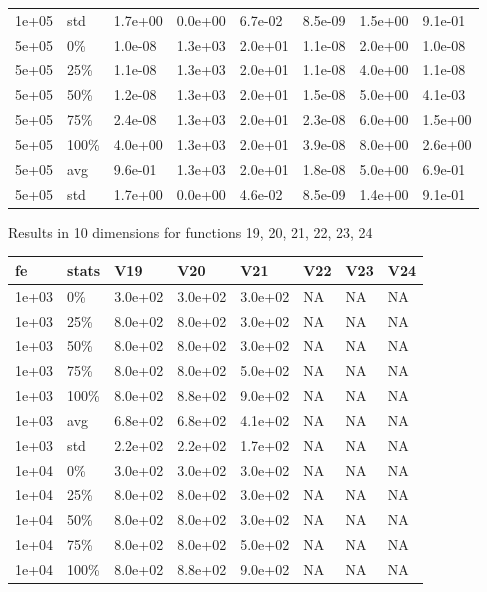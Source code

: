 \documentclass[11pt]{article}
\begin{document}
{\begin{longtable}{llllllll}
  1e+05 & std & 1.7e+00 & 0.0e+00 & 6.7e-02 & 8.5e-09 & 1.5e+00 & 9.1e-01 \\ 
  5e+05 & 0\% & 1.0e-08 & 1.3e+03 & 2.0e+01 & 1.1e-08 & 2.0e+00 & 1.0e-08 \\ 
  5e+05 & 25\% & 1.1e-08 & 1.3e+03 & 2.0e+01 & 1.1e-08 & 4.0e+00 & 1.1e-08 \\ 
  5e+05 & 50\% & 1.2e-08 & 1.3e+03 & 2.0e+01 & 1.5e-08 & 5.0e+00 & 4.1e-03 \\ 
  5e+05 & 75\% & 2.4e-08 & 1.3e+03 & 2.0e+01 & 2.3e-08 & 6.0e+00 & 1.5e+00 \\ 
  5e+05 & 100\% & 4.0e+00 & 1.3e+03 & 2.0e+01 & 3.9e-08 & 8.0e+00 & 2.6e+00 \\ 
  5e+05 & avg & 9.6e-01 & 1.3e+03 & 2.0e+01 & 1.8e-08 & 5.0e+00 & 6.9e-01 \\ 
  5e+05 & std & 1.7e+00 & 0.0e+00 & 4.6e-02 & 8.5e-09 & 1.4e+00 & 9.1e-01 \\ 
   \hline
\hline
\end{longtable}
\newpage
Results in 10 dimensions for functions 19, 20, 21, 22, 23, 24
\begin{longtable}{llllllll}
  \hline
fe & stats & V19 & V20 & V21 & V22 & V23 & V24 \\ 
  \hline
1e+03 & 0\% & 3.0e+02 & 3.0e+02 & 3.0e+02 & NA & NA & NA \\ 
  1e+03 & 25\% & 8.0e+02 & 8.0e+02 & 3.0e+02 & NA & NA & NA \\ 
  1e+03 & 50\% & 8.0e+02 & 8.0e+02 & 3.0e+02 & NA & NA & NA \\ 
  1e+03 & 75\% & 8.0e+02 & 8.0e+02 & 5.0e+02 & NA & NA & NA \\ 
  1e+03 & 100\% & 8.0e+02 & 8.8e+02 & 9.0e+02 & NA & NA & NA \\ 
  1e+03 & avg & 6.8e+02 & 6.8e+02 & 4.1e+02 & NA & NA & NA \\ 
  1e+03 & std & 2.2e+02 & 2.2e+02 & 1.7e+02 & NA & NA & NA \\ 
  1e+04 & 0\% & 3.0e+02 & 3.0e+02 & 3.0e+02 & NA & NA & NA \\ 
  1e+04 & 25\% & 8.0e+02 & 8.0e+02 & 3.0e+02 & NA & NA & NA \\ 
  1e+04 & 50\% & 8.0e+02 & 8.0e+02 & 3.0e+02 & NA & NA & NA \\ 
  1e+04 & 75\% & 8.0e+02 & 8.0e+02 & 5.0e+02 & NA & NA & NA \\ 
  1e+04 & 100\% & 8.0e+02 & 8.8e+02 & 9.0e+02 & NA & NA & NA \\ 

\end{longtable}}
\end{document}

